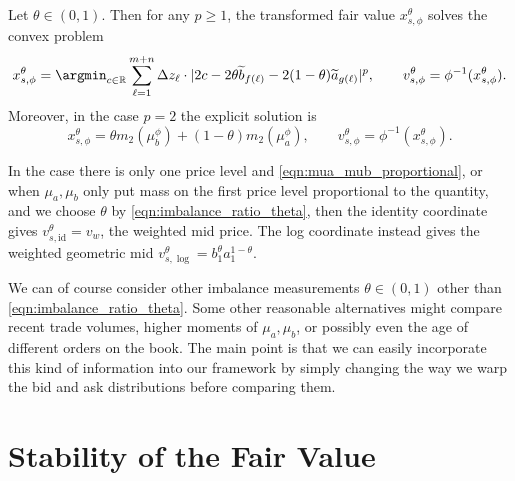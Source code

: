\begin{theorem}
    Let $\theta \in (0,1)$. Then for any $p \geq 1$, the transformed fair value
    $x_{s,\phi}^\theta$ solves the convex problem
%
\begin{equation}
   x_{s,\phi}^\theta = \argmin_{c \in \mathbb R} \sum_{\ell = 1}^{m+n} \Delta z_\ell \cdot
   |2c - 2\theta \widetilde b_{f(\ell)} - 2(1-\theta)\widetilde a_{g(\ell)}|^p,
   \qquad v_{s,\phi}^\theta=\phi^{-1}(x_{s,\phi}^\theta).
   \label{eqn:wp_imbalanced_symmetric_fair_value}
\end{equation}
%
\noindent Moreover, in the case $p = 2$ the explicit solution is
%
\begin{equation}
    x_{s,\phi}^\theta=\theta m_2(\mu_b^\phi)+(1-\theta)m_2(\mu_a^\phi),
    \qquad v_{s,\phi}^\theta=\phi^{-1}(x_{s,\phi}^\theta).
    \label{eqn:w2_imbalanced_symmetric_fair_value}
\end{equation}
    \label{thm:imbalanced_wasserstein_solution}
\end{theorem}

%
\begin{remark}
    In the case there is only one price level and \eqref{eqn:mua_mub_proportional}, or
    when $\mu_a, \mu_b$ only put mass on the first price level proportional to the quantity,
    and we choose $\theta$ by \eqref{eqn:imbalance_ratio_theta}, then the identity coordinate gives
    $v_{s,\mathrm{id}}^\theta=v_w$, the weighted mid price. The log coordinate instead gives the weighted geometric mid
    $v_{s,\log}^\theta=b_1^\theta a_1^{1-\theta}$.
\end{remark}


\noindent We can of course consider other imbalance measurements
$\theta \in (0,1)$ other than \eqref{eqn:imbalance_ratio_theta}.
Some other reasonable alternatives might compare recent trade
volumes, higher moments of $\mu_a, \mu_b$, or possibly even
the age of different orders on the book. The main point is that
 we can easily incorporate this kind of information into our
 framework by simply changing the way we warp the bid and ask
 distributions before comparing them.

\section{Stability of the Fair Value}
\label{sec:stability_fv}

